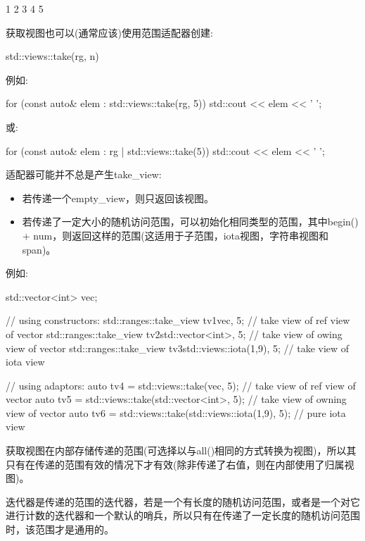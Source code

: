\begin{shell}
1 2 3 4 5
\end{shell}


获取视图也可以(通常应该)使用范围适配器创建:

\begin{cpp}
std::views::take(rg, n)
\end{cpp}

例如:

\begin{cpp}
for (const auto& elem : std::views::take(rg, 5)) {
	std::cout << elem << ' ';
}
\end{cpp}

或:

\begin{cpp}
for (const auto& elem : rg | std::views::take(5)) {
	std::cout << elem << ' ';
}
\end{cpp}

适配器可能并不总是产生take\_view:

\begin{itemize}
\item
若传递一个empty\_view，则只返回该视图。

\item
若传递了一定大小的随机访问范围，可以初始化相同类型的范围，其中begin() + num，则返回这样的范围(这适用于子范围，iota视图，字符串视图和span)。
\end{itemize}

例如:

\begin{cpp}
std::vector<int> vec;

// using constructors:
std::ranges::take_view tv1{vec, 5}; // take view of ref view of vector
std::ranges::take_view tv2{std::vector<int>{}, 5}; // take view of owing view of vector
std::ranges::take_view tv3{std::views::iota(1,9), 5}; // take view of iota view

// using adaptors:
auto tv4 = std::views::take(vec, 5); // take view of ref view of vector
auto tv5 = std::views::take(std::vector<int>{}, 5); // take view of owning view of vector
auto tv6 = std::views::take(std::views::iota(1,9), 5); // pure iota view
\end{cpp}

获取视图在内部存储传递的范围(可选择以与all()相同的方式转换为视图)，所以其只有在传递的范围有效的情况下才有效(除非传递了右值，则在内部使用了归属视图)。

迭代器是传递的范围的迭代器，若是一个有长度的随机访问范围，或者是一个对它进行计数的迭代器和一个默认的哨兵，所以只有在传递了一定长度的随机访问范围时，该范围才是通用的。

